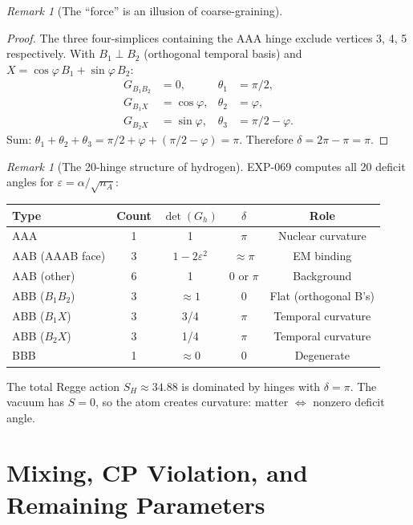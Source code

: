 \documentclass[12pt]{article}
\theoremstyle{remark}
\newtheorem{remark}[theorem]{Remark}
\theoremstyle{definition}
\begin{document}
\begin{remark}[The ``force'' is an illusion of coarse-graining]
\begin{proof}
The three four-simplices containing the AAA hinge exclude vertices 3, 4, 5 respectively.  With $B_1 \perp B_2$ (orthogonal temporal basis) and $X = \cos\varphi\,B_1 + \sin\varphi\,B_2$:
\begin{align}
G_{B_1 B_2} &= 0, & \theta_1 &= \pi/2, \\
G_{B_1 X} &= \cos\varphi, & \theta_2 &= \varphi, \\
G_{B_2 X} &= \sin\varphi, & \theta_3 &= \pi/2 - \varphi.
\end{align}
Sum: $\theta_1 + \theta_2 + \theta_3 = \pi/2 + \varphi + (\pi/2 - \varphi) = \pi$.  Therefore $\delta = 2\pi - \pi = \pi$.
\end{proof}

\begin{remark}[The 20-hinge structure of hydrogen]
EXP-069 computes all 20 deficit angles for $\varepsilon = \alpha/\sqrt{n_A}$:
\begin{center}
\begin{tabular}{lcccc}
\hline
Type & Count & $\det(G_h)$ & $\delta$ & Role \\
\hline
AAA & 1 & 1 & $\pi$ & Nuclear curvature \\
AAB (AAAB face) & 3 & $1-2\varepsilon^2$ & $\approx \pi$ & EM binding \\
AAB (other) & 6 & 1 & $0$ or $\pi$ & Background \\
ABB ($B_1 B_2$) & 3 & $\approx 1$ & $0$ & Flat (orthogonal B's) \\
ABB ($B_1 X$) & 3 & 3/4 & $\pi$ & Temporal curvature \\
ABB ($B_2 X$) & 3 & 1/4 & $\pi$ & Temporal curvature \\
BBB & 1 & $\approx 0$ & 0 & Degenerate \\
\hline
\end{tabular}
\end{center}
The total Regge action $S_H \approx 34.88$ is dominated by hinges with $\delta = \pi$.  The vacuum has $S = 0$, so the atom creates curvature: matter $\Leftrightarrow$ nonzero deficit angle.
\end{remark}



\section{Mixing, CP Violation, and Remaining Parameters}
\label{ch:mixing}


\end{remark}
\end{document}
